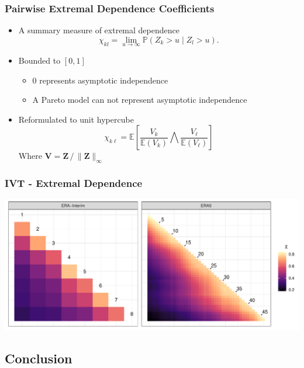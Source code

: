 \documentclass[aspectratio=169,10pt]{beamer}
\begin{document}
\begin{frame}
  \frametitle{Pairwise Extremal Dependence Coefficients}
    \begin{itemize}
      \item A summary measure of extremal dependence
      \begin{equation*}
        \chi_{kl} = \lim\limits_{u\to\infty}\mathbb{P}\left(Z_k > u\mid Z_l > u\right).
      \end{equation*}
      \item Bounded to $[0,1]$
        \begin{itemize}
          \item $0$ represents asymptotic independence
          \item A Pareto model can not represent asymptotic independence
        \end{itemize}
      \item Reformulated to unit hypercube
        \begin{equation*}
          \chi_{k\ell} = \mathbb{E}\left[\frac{V_k}{\mathbb{E}(V_k)}{\bigwedge}\frac{V_{\ell}}{\mathbb{E}(V_{\ell})}\right]
        \end{equation*}
        Where $\bm{V} = \bm{Z}\,/\, \lVert\bm{Z}\rVert_{\infty}$
    \end{itemize}
\end{frame} %

\begin{frame}
  \frametitle{IVT - Extremal Dependence}
  \centering
  \includegraphics[width=0.99\linewidth]{./ch1/images/chi_ij_c}
\end{frame} %

\subsection{Conclusion}
\end{document}
